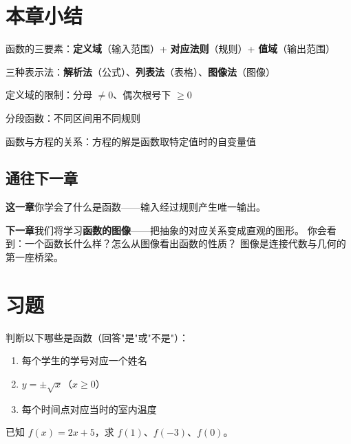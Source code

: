 \section{本章小结}

\begin{progressbox}
函数的三要素：\textbf{定义域}（输入范围）+ \textbf{对应法则}（规则）+ \textbf{值域}（输出范围）

三种表示法：\textbf{解析法}（公式）、\textbf{列表法}（表格）、\textbf{图像法}（图像）

定义域的限制：分母 \(\neq 0\)、偶次根号下 \(\ge 0\)

分段函数：不同区间用不同规则

函数与方程的关系：方程的解是函数取特定值时的自变量值
\end{progressbox}

\subsection*{通往下一章}

\textbf{这一章}你学会了什么是函数——输入经过规则产生唯一输出。

\textbf{下一章}我们将学习\textbf{函数的图像}——把抽象的对应关系变成直观的图形。
你会看到：一个函数长什么样？怎么从图像看出函数的性质？
图像是连接代数与几何的第一座桥梁。


\section{习题}


\begin{exercise}[0]
判断以下哪些是函数（回答"是"或"不是"）：
\begin{enumerate}
  \item[(1)] 每个学生的学号对应一个姓名
  \item[(2)] \(y = \pm \sqrt{x}\)（\(x \ge 0\)）
  \item[(3)] 每个时间点对应当时的室内温度
\end{enumerate}
\end{exercise}

\begin{exercise}[0]
已知 \(f(x) = 2x + 5\)，求 \(f(1)\)、\(f(-3)\)、\(f(0)\)。
\end{exercise}


